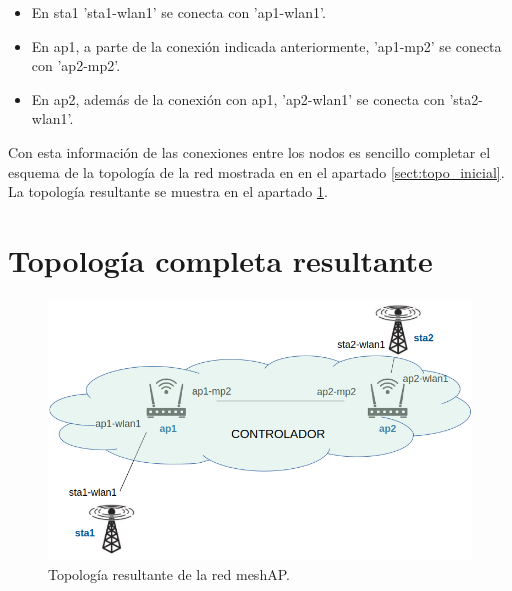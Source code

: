 \documentclass[a4paper,12pt,twoside,spanish]{book}
\begin{document}
\begin{itemize}
	\item En sta1 'sta1-wlan1' se conecta con 'ap1-wlan1'.
	\item En ap1, a parte de la conexión indicada anteriormente, 'ap1-mp2' se conecta con 'ap2-mp2'.
	\item En ap2, además de la conexión con ap1, 'ap2-wlan1' se conecta con 'sta2-wlan1'.
\end{itemize}

Con esta información de las conexiones entre los nodos es sencillo completar el esquema de la topología de la red mostrada en en el apartado \ref{sect:topo_inicial}. La topología resultante se muestra en el apartado \ref{sect:topo_completa}.\par 

\section{Topología completa resultante}\label{sect:topo_completa}

	\begin{figure}[!h]
		\centering
		\includegraphics[scale=.4]{Figuras/topo_completa.png}
		\caption{Topología resultante de la red meshAP.}
		\label{fig:topo_completa}
	\end{figure}
\end{document}
